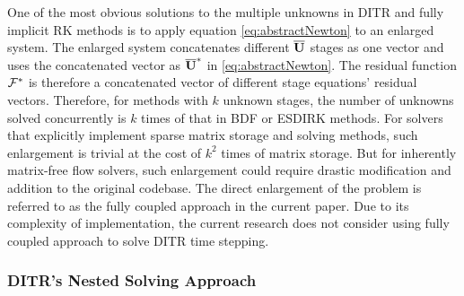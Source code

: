 \documentclass[preprint,12pt]{elsarticle}
\begin{document}
One of the most obvious solutions to the multiple unknowns
in DITR and fully implicit RK methods is to apply
equation \eqref{eq:abstractNewton} to an enlarged
system.
The enlarged system concatenates different $\overline{\mathbf{U}}$
stages as one vector and uses the concatenated vector as
$\overline{\mathbf{U}}^*$ in \eqref{eq:abstractNewton}.
The residual function $\mathcal{F}^*$ is therefore a concatenated vector of
different stage equations' residual vectors.
Therefore, for methods with $k$ unknown stages, the number of
unknowns solved concurrently is $k$ times of that in BDF or ESDIRK methods.
For solvers that explicitly implement sparse matrix storage
and solving methods, such enlargement is trivial at the cost of $k^2$ times
of matrix storage. But for inherently matrix-free flow solvers,
such enlargement could require drastic modification and addition to
the original codebase.
The direct enlargement of the problem is referred to as
the fully coupled approach in the current paper.
Due to its complexity of implementation,
the current research does not consider using fully coupled approach
to solve DITR time stepping.




\subsubsection{DITR's Nested Solving Approach}
\end{document}
